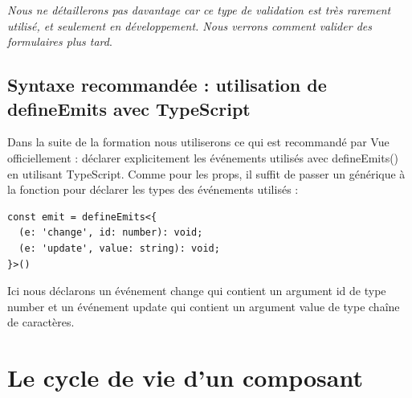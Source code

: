 {\em Nous ne détaillerons pas davantage car ce type de validation est très rarement utilisé, et seulement en développement. Nous verrons comment valider des formulaires plus tard}.

\subsection{Syntaxe recommandée : utilisation de {\color{monOrange}defineEmits} avec {\color{monOrange}TypeScript}}
Dans la suite de la formation nous utiliserons ce qui est recommandé par {\color{monOrange}Vue} officiellement : déclarer explicitement les événements utilisés avec {\color{monOrange}defineEmits()} en utilisant {\color{monOrange}TypeScript}. Comme pour les {\color{monOrange}props}, il suffit de passer un générique à la fonction pour déclarer les types des événements utilisés :
\begin{verbatim}
const emit = defineEmits<{
  (e: 'change', id: number): void;
  (e: 'update', value: string): void;
}>()
\end{verbatim}

Ici nous déclarons un événement {\color{monOrange}change} qui contient un argument {\color{monOrange}id} de type {\color{monOrange}number} et un événement {\color{monOrange}update} qui contient un argument {\color{monOrange}value} de type chaîne de caractères.



\section{Le cycle de vie d'un composant}
